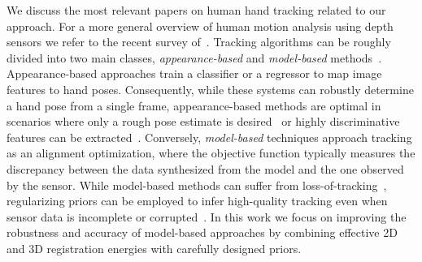 We discuss the most relevant papers on human hand tracking related to our approach. For a more general overview of human motion analysis using depth sensors we refer to the recent survey of~\cite{ye_13}.
%
%
%
Tracking algorithms can be roughly divided into two main classes, \emph{appearance-based} and \emph{model-based} methods~\cite{erol_cviu07}.
Appearance-based approaches train a classifier or a regressor to map image features to hand poses. Consequently, while these systems can robustly determine a hand pose from a single frame, appearance-based methods are optimal in scenarios where only a rough pose estimate is desired~\cite{wang_uist11} or highly discriminative features can be extracted~\cite{wang_sig09}. Conversely, \emph{model-based} techniques approach tracking as an alignment optimization, where the objective function typically measures the discrepancy between the data synthesized from the model and the one observed by the sensor. While model-based methods can suffer from loss-of-tracking~\cite{wei_siga12}, regularizing priors can be employed to infer high-quality tracking even when sensor data is incomplete or corrupted~\cite{melax_13,schroeder_icra14}. 
In this work we focus on improving the robustness and accuracy of model-based approaches by combining effective 2D and 3D registration energies with carefully designed priors.

